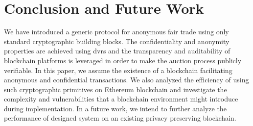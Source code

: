 \section{Conclusion and Future Work}
\label{sec-conclusion}
We have introduced a generic protocol for anonymous fair trade using
only standard cryptographic building blocks. The confidentiality and
anonymity properties are achieved using \gls{dvrs} and the
transparency and auditability of blockchain platforms is leveraged in
order to make the auction process publicly verifiable.  In this paper,
we assume the existence of a blockchain facilitating anonymous and
confidential transactions. We also analyzed the
efficiency of using such cryptographic primitives on Ethereum blockchain
and investigate the complexity and vulnerabilities that a blockchain
environment might introduce during implementation. In a future work, we intend to further analyze the performance of designed system on an existing privacy preserving blockchain.